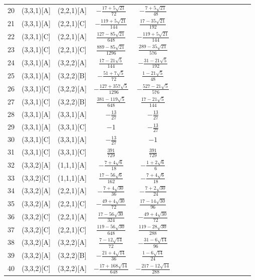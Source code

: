 \documentclass[11pt]{article}
\begin{document}
\begin{longtable}{ | p{1cm}| *{15}{c|} }
20 & (3,3,1)[A] & (2,2,1)[A] & $-\frac{17+5\sqrt{21}}{72}$ & $-\frac{7+5\sqrt{21}}{48}$\\
21 & (3,3,1)[A] & (2,2,1)[C] & $-\frac{119+5\sqrt{21}}{144}$ & $\frac{17-35\sqrt{21}}{192}$\\
22 & (3,3,1)[C] & (2,2,1)[A] & $\frac{127-85\sqrt{21}}{648}$ & $-\frac{119+5\sqrt{21}}{144}$\\
23 & (3,3,1)[C] & (2,2,1)[C] & $\frac{889-85\sqrt{21}}{1296}$ & $\frac{289-35\sqrt{21}}{576}$\\
24 & (3,3,1)[A] & (3,2,2)[A] & $\frac{17-21\sqrt{5}}{144}$ & $-\frac{31-21\sqrt{5}}{192}$\\
25 & (3,3,1)[A] & (3,2,2)[B] & $-\frac{51+7\sqrt{5}}{72}$ & $\frac{1-21\sqrt{5}}{48}$\\
26 & (3,3,1)[C] & (3,2,2)[A] & $-\frac{127+357\sqrt{5}}{1296}$ & $-\frac{527-21\sqrt{5}}{576}$\\
27 & (3,3,1)[C] & (3,2,2)[B] & $\frac{381-119\sqrt{5}}{648}$ & $\frac{17-21\sqrt{5}}{144}$\\
28 & (3,3,1)[A] & (3,3,1)[A] & $-\frac{13}{27}$ & $-\frac{13}{27}$\\
29 & (3,3,1)[A] & (3,3,1)[C] & $-1$ & $-\frac{13}{27}$\\
30 & (3,3,1)[C] & (3,3,1)[A] & $-\frac{13}{27}$ & $-1$\\
31 & (3,3,1)[C] & (3,3,1)[C] & $\frac{391}{729}$ & $\frac{391}{729}$\\
32 & (3,3,2)[A] & (1,1,1)[A] & $-\frac{7+4\sqrt{6}}{18}$ & $-\frac{1+2\sqrt{6}}{6}$\\
33 & (3,3,2)[C] & (1,1,1)[A] & $\frac{17-56\sqrt{6}}{162}$ & $-\frac{7+4\sqrt{6}}{18}$\\
34 & (3,3,2)[A] & (2,2,1)[A] & $-\frac{7+4\sqrt{30}}{36}$ & $-\frac{7+2\sqrt{30}}{24}$\\
35 & (3,3,2)[A] & (2,2,1)[C] & $-\frac{49+4\sqrt{30}}{72}$ & $\frac{17-14\sqrt{30}}{96}$\\
36 & (3,3,2)[C] & (2,2,1)[A] & $\frac{17-56\sqrt{30}}{324}$ & $-\frac{49+4\sqrt{30}}{72}$\\
37 & (3,3,2)[C] & (2,2,1)[C] & $\frac{119-56\sqrt{30}}{648}$ & $\frac{119-28\sqrt{30}}{288}$\\
38 & (3,3,2)[A] & (3,2,2)[A] & $\frac{7-12\sqrt{14}}{72}$ & $-\frac{31-6\sqrt{14}}{96}$\\
39 & (3,3,2)[A] & (3,2,2)[B] & $-\frac{21+4\sqrt{14}}{36}$ & $\frac{1-6\sqrt{14}}{24}$\\
40 & (3,3,2)[C] & (3,2,2)[A] & $-\frac{17+168\sqrt{14}}{648}$ & $-\frac{217-12\sqrt{14}}{288}$\\

\end{longtable}
\end{document}

